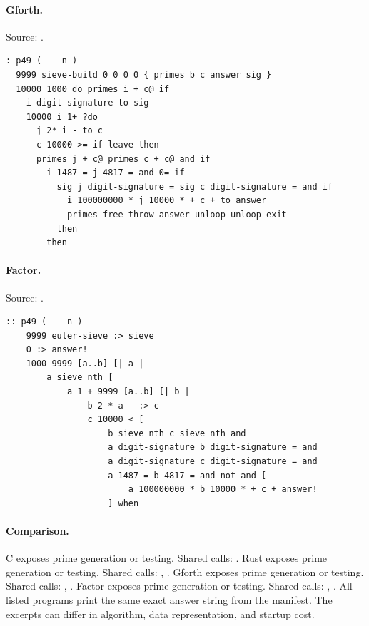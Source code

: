 \paragraph{Gforth.} Source: .
\begin{lstlisting}
: p49 ( -- n )
  9999 sieve-build 0 0 0 0 { primes b c answer sig }
  10000 1000 do primes i + c@ if
    i digit-signature to sig
    10000 i 1+ ?do
      j 2* i - to c
      c 10000 >= if leave then
      primes j + c@ primes c + c@ and if
        i 1487 = j 4817 = and 0= if
          sig j digit-signature = sig c digit-signature = and if
            i 100000000 * j 10000 * + c + to answer
            primes free throw answer unloop unloop exit
          then
        then
\end{lstlisting}

\paragraph{Factor.} Source: .
\begin{lstlisting}
:: p49 ( -- n )
    9999 euler-sieve :> sieve
    0 :> answer!
    1000 9999 [a..b] [| a |
        a sieve nth [
            a 1 + 9999 [a..b] [| b |
                b 2 * a - :> c
                c 10000 < [
                    b sieve nth c sieve nth and
                    a digit-signature b digit-signature = and
                    a digit-signature c digit-signature = and
                    a 1487 = b 4817 = and not and [
                        a 100000000 * b 10000 * + c + answer!
                    ] when
\end{lstlisting}

\paragraph{Comparison.}
C exposes prime generation or testing. Shared calls: \texttt{}. Rust exposes prime generation or testing. Shared calls: \texttt{}, \texttt{}. Gforth exposes prime generation or testing. Shared calls: \texttt{}, \texttt{}. Factor exposes prime generation or testing. Shared calls: \texttt{}, \texttt{}.
All listed programs print the same exact answer string from the manifest. The excerpts can differ in algorithm, data representation, and startup cost.

